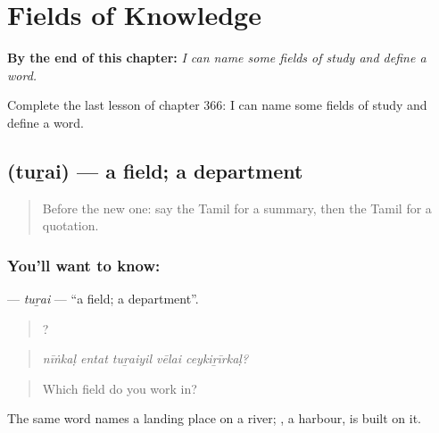 
\chapter{Fields of Knowledge}
\label{ch:ta-fields-of-knowledge}

\begin{chapteropening}
\textbf{By the end of this chapter:} \emph{I can name some fields of study and define a word.}

Complete the last lesson of chapter 366: I can name some fields of study and define a word.
\end{chapteropening}

\section[\texorpdfstring{\ta{துறை} (tuṟai)}{துறை (tuṟai)}]{ (tuṟai) — a field; a department}

\label{lesson:TA-C366-turai}



\begin{quote}
Before the new one: say the Tamil for a summary, then the Tamil for a quotation.
\end{quote}

\subsection*{You'll want to know: }
\textbf{} — \emph{tuṟai} — \textquotedblleft{}a field; a department\textquotedblright{}.

\begin{quote}
    ?
\end{quote}

\begin{quote}
\emph{nīṅkaḷ entat tuṟaiyil vēlai ceykiṟīrkaḷ?}
\end{quote}

\begin{quote}
Which field do you work in?
\end{quote}

The same word names a landing place on a river; , a harbour, is built on it.

